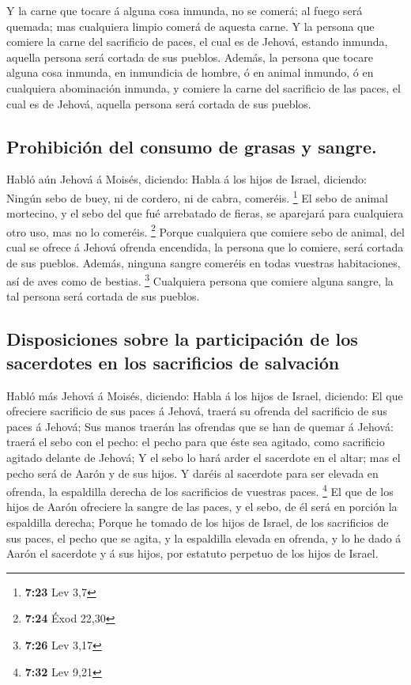  Y la carne que tocare á alguna cosa inmunda, no se comerá;
al fuego será quemada; mas cualquiera limpio comerá de aquesta carne.
 Y la persona que comiere la carne del sacrificio de paces,
el cual es de Jehová, estando inmunda, aquella persona será cortada de
sus pueblos.  Además, la persona que tocare alguna cosa
inmunda, en inmundicia de hombre, ó en animal inmundo, ó en cualquiera
abominación inmunda, y comiere la carne del sacrificio de las paces, el
cual es de Jehová, aquella persona será cortada de sus pueblos.

\hypertarget{prohibiciuxf3n-del-consumo-de-grasas-y-sangre.}{%
\subsection{Prohibición del consumo de grasas y
sangre.}\label{prohibiciuxf3n-del-consumo-de-grasas-y-sangre.}}

 Habló aún Jehová á Moisés, diciendo:  Habla á
los hijos de Israel, diciendo: Ningún sebo de buey, ni de cordero, ni de
cabra, comeréis. \footnote{\textbf{7:23} Lev 3,7}  El sebo
de animal mortecino, y el sebo del que fué arrebatado de fieras, se
aparejará para cualquiera otro uso, mas no lo comeréis. \footnote{\textbf{7:24}
  Éxod 22,30}  Porque cualquiera que comiere sebo de
animal, del cual se ofrece á Jehová ofrenda encendida, la persona que lo
comiere, será cortada de sus pueblos.  Además, ninguna
sangre comeréis en todas vuestras habitaciones, así de aves como de
bestias. \footnote{\textbf{7:26} Lev 3,17}  Cualquiera
persona que comiere alguna sangre, la tal persona será cortada de sus
pueblos.

\hypertarget{disposiciones-sobre-la-participaciuxf3n-de-los-sacerdotes-en-los-sacrificios-de-salvaciuxf3n}{%
\subsection{Disposiciones sobre la participación de los sacerdotes en
los sacrificios de
salvación}\label{disposiciones-sobre-la-participaciuxf3n-de-los-sacerdotes-en-los-sacrificios-de-salvaciuxf3n}}

 Habló más Jehová á Moisés, diciendo:  Habla á
los hijos de Israel, diciendo: El que ofreciere sacrificio de sus paces
á Jehová, traerá su ofrenda del sacrificio de sus paces á Jehová;
 Sus manos traerán las ofrendas que se han de quemar á
Jehová: traerá el sebo con el pecho: el pecho para que éste sea agitado,
como sacrificio agitado delante de Jehová;  Y el sebo lo
hará arder el sacerdote en el altar; mas el pecho será de Aarón y de sus
hijos.  Y daréis al sacerdote para ser elevada en ofrenda,
la espaldilla derecha de los sacrificios de vuestras paces. \footnote{\textbf{7:32}
  Lev 9,21}  El que de los hijos de Aarón ofreciere la
sangre de las paces, y el sebo, de él será en porción la espaldilla
derecha;  Porque he tomado de los hijos de Israel, de los
sacrificios de sus paces, el pecho que se agita, y la espaldilla elevada
en ofrenda, y lo he dado á Aarón el sacerdote y á sus hijos, por
estatuto perpetuo de los hijos de Israel.


